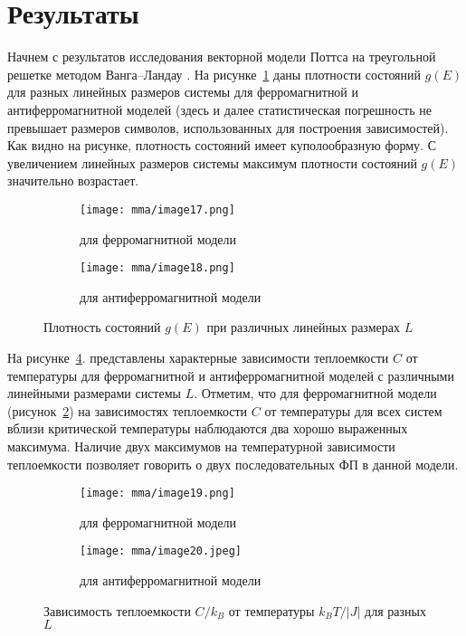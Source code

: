 \section{Результаты}
Начнем с результатов исследования векторной модели Поттса на треугольной решетке методом Ванга--Ландау \cite{bib:mma-9, bib:mma-10, bib:mma-11}.
На рисунке~\ref{fig:mma-2} даны плотности состояний $g(E)$ для разных линейных размеров системы для ферромагнитной и антиферромагнитной моделей (здесь и далее статистическая погрешность не превышает размеров символов, использованных для построения зависимостей). Как видно на рисунке, плотность состояний имеет куполообразную форму. С увеличением линейных размеров системы максимум плотности состояний $g(E)$ значительно возрастает.
\begin{figure}[ht]
    \centering
    \begin{subfigure}{0.45\textwidth}
        \texttt{[image: mma/image17.png]}
        \caption{для ферромагнитной модели}
    \end{subfigure}
    \begin{subfigure}{0.45\textwidth}
        \texttt{[image: mma/image18.png]}
        \caption{для антиферромагнитной модели}
    \end{subfigure}
    \caption{Плотность состояний $g(E)$ при различных линейных размерах $L$}
    \label{fig:mma-2}
\end{figure}

На рисунке~\ref{fig:mma-3}. представлены характерные зависимости теплоемкости $C$ от температуры для ферромагнитной и антиферромагнитной моделей с различными линейными размерами системы $L$. Отметим, что для ферромагнитной модели (рисунок~\ref{fig:mma-3a}) на зависимостях теплоемкости $C$ от температуры для всех систем вблизи критической температуры наблюдаются два хорошо выраженных максимума. Наличие двух максимумов на температурной зависимости теплоемкости позволяет говорить о двух последовательных ФП в данной модели.
\begin{figure}[ht]
    \centering
    \begin{subfigure}{0.45\textwidth}
        \texttt{[image: mma/image19.png]}
        \caption{для ферромагнитной модели}
        \label{fig:mma-3a}
    \end{subfigure}
    \begin{subfigure}{0.45\textwidth}
        \texttt{[image: mma/image20.jpeg]}
        \caption{для антиферромагнитной модели}
        \label{fig:mma-3b}
    \end{subfigure}
    \caption{Зависимость теплоемкости $C/k_B$ от температуры $k_B T/ \left|J\right|$ для разных $L$}
    \label{fig:mma-3}
\end{figure}

